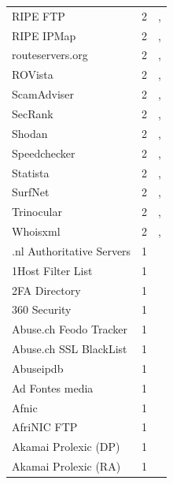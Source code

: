 \documentclass[11pt,a4paper]{article}
\begin{document}
\begin{longtable}{@{}p{} p{}p{}@{}}
RIPE FTP  & 2 & \cite{10.1145/3730567.3764452}, \cite{10.1145/3618257.3624815} \\
RIPE IPMap & 2 & \cite{10.1145/3730567.3764427}, \cite{10.1145/3777912.3839804} \\
routeservers.org & 2 & \cite{10.1145/3618257.3624812}, \cite{10.1007/978-3-031-85960-1_15} \\
ROVista & 2 & \cite{10.1145/3777912.3809144}, \cite{10.1145/3777912.3839812} \\
ScamAdviser & 2 & \cite{10.1145/3618257.3624822}, \cite{10.1145/3777912.3839787} \\
SecRank & 2 & \cite{10.1145/3646547.3688449}, \cite{10.1145/3517745.3561444} \\
Shodan  & 2 & \cite{10.1145/3487552.3487833}, \cite{10.1145/3487552.3487835} \\
Speedchecker & 2 & \cite{10.1145/3487552.3487854}, \cite{10.1145/3487552.3487862} \\
Statista & 2 & \cite{10.1007/978-3-031-28486-1_3}, \cite{10.1007/978-3-031-28486-1_8} \\
SurfNet & 2 & \cite{10.1145/3777912.3839790}, \cite{10.1007/978-3-032-18268-5_14} \\
Trinocular & 2 & \cite{10.1145/3618257.3624796}, \cite{10.1007/978-3-031-56252-5_7} \\
Whoisxml & 2 & \cite{10.1145/3618257.3624805}, \cite{10.1007/978-3-032-18268-5_15} \\
.nl Authoritative Servers & 1 & \cite{10.1007/978-3-030-72582-2_27} \\
1Host Filter List & 1 & \cite{10.1007/978-3-030-98785-5_19} \\
2FA Directory & 1 & \cite{10.1007/978-3-032-18268-5_15} \\
360 Security & 1 & \cite{10.1145/3618257.3624839} \\
Abuse.ch Feodo Tracker & 1 & \cite{10.1007/978-3-031-28486-1_6} \\
Abuse.ch SSL BlackList & 1 & \cite{10.1007/978-3-031-28486-1_6} \\
Abuseipdb & 1 & \cite{10.1145/3777912.3839790} \\
Ad Fontes media & 1 & \cite{10.1007/978-3-031-28486-1_8} \\
Afnic & 1 & \cite{10.1007/978-3-031-85960-1_5} \\
AfriNIC FTP & 1 & \cite{10.1145/3487552.3487838} \\
Akamai Prolexic (DP) & 1 & \cite{10.1145/3646547.3688451} \\
Akamai Prolexic (RA) & 1 & \cite{10.1145/3646547.3688451} \\

\end{longtable}
\end{document}

